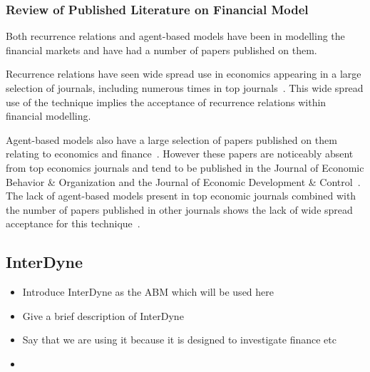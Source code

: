 \documentclass{article}
\begin{document}
\subsubsection{Review of Published Literature on Financial Model} \label{litreviewofabmrr} %

Both recurrence relations and agent-based models have been in modelling the financial markets and have had a number of papers published on them.

Recurrence relations have seen wide spread use in economics appearing in a large selection of journals, including numerous times in top journals~\cite{rra10, rra1, rra2, rra3, rra4, rra5, rra6, rra7, rra8, rra9}. This wide spread use of the technique implies the acceptance of recurrence relations within financial modelling.      

Agent-based models also have a large selection of papers published on them relating to economics and finance~\cite{ abma2, abma3, abma4}. However these papers are noticeably absent from top economics journals and tend to be published in the Journal of Economic Behavior \& Organization and the Journal of Economic Development \& Control~\cite{whereabmp, farmerfoleynature}. The lack of agent-based models present in top economic journals combined with the number of papers published in other journals shows the lack of wide spread acceptance for this technique~\cite{agbntj}.




\subsection{InterDyne} \label{InterDyne_section}
\begin{itemize}
  \item Introduce InterDyne as the ABM which will be used here 
  \item Give a brief description of InterDyne 
  \item Say that we are using it because it is designed to investigate finance etc
  \item
\end{itemize}
\end{document}
